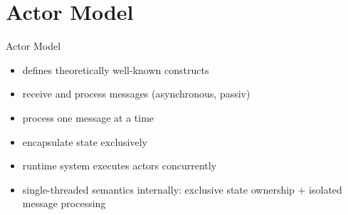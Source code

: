 \documentclass{beamer}
\begin{document}

\section{Actor Model}






\begin{frame}{Actor Model}

\pause

\begin{itemize}
  \item defines theoretically well-known constructs
  \item receive and process messages (asynchronous, passiv)
  \item process one message at a time
  \item encapsulate state exclusively
  \item runtime system executes actors concurrently
  \item single-threaded semantics internally: exclusive state ownership $+$ isolated message processing
\end{itemize}

\end{frame}



  
\end{document}
